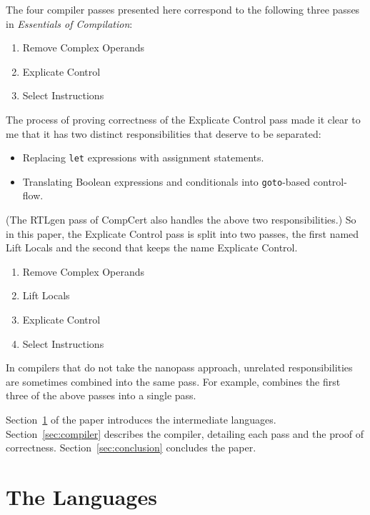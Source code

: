 \documentclass[sigplan,screen]{acmart}
\begin{document}
The four compiler passes presented here correspond to the
following three passes in \emph{Essentials of Compilation}:
\begin{enumerate}
\item Remove Complex Operands
\item Explicate Control
\item Select Instructions
\end{enumerate}
The process of proving correctness of the Explicate Control pass
made it clear to me that it has two distinct responsibilities that
deserve to be separated:
\begin{itemize}
\item Replacing \texttt{let} expressions with assignment statements.
\item Translating Boolean expressions and conditionals into
  \texttt{goto}-based control-flow.
\end{itemize}
(The RTLgen pass of CompCert also handles the above two
responsibilities.)  So in this paper, the Explicate Control pass is
split into two passes, the first named Lift Locals and the second that
keeps the name Explicate Control.
\begin{enumerate}
\item Remove Complex Operands
\item Lift Locals
\item Explicate Control
\item Select Instructions
\end{enumerate}
In compilers that do not take the nanopass approach, unrelated
responsibilities are sometimes combined into the same pass.  For
example, \citet{Sumii:2005aa} combines the first three of the above
passes into a single pass.

Section~\ref{sec:langs} of the paper introduces the intermediate
languages. Section~\ref{sec:compiler} describes the compiler,
detailing each pass and the proof of
correctness. Section~\ref{sec:conclusion} concludes the paper.

\section{The Languages}
\label{sec:langs}
\end{document}
